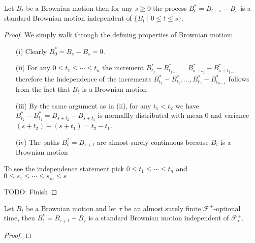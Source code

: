 \begin{thm}\label{MarkovPropertyBrownianMotion}Let $B_t$ be a
  Brownian motion then for any $s \geq 0$ the process $B^*_t = B_{t + s} -
  B_s$ is a standard Brownian motion independent of $\lbrace B_t \mid
  0 \leq t \leq s \rbrace$.
\end{thm}
\begin{proof}
We simply walk through the defining properties of Brownian motion:
\begin{itemize}
\item[(i)] Clearly $B^*_0 = B_s - B_s = 0$.
\item[(ii)] For any $0 \leq t_1 \leq \cdots \leq t_n$ the increment
  $B^*_{t_j} - B^*_{t_{j-1}} = B^*_{s+ t_j} - B^*_{s+ t_{j-1}}$
  therefore the independence of the increments $B^*_{t_2} -
  B^*_{t_1}, \dotsc, B^*_{t_n} - B^*_{t_{n-1}}$ follows from the fact
  that $B_t$ is a Brownian motion
\item[(iii)]By the same argument as in (ii), for any $t_1 < t_2$ we
  have $B^*_{t_2} -  B^*_{t_1} = B_{s+t_2} -  B_{s+t_1}$ is normallly
  distributed with mean $0$ and variance $(s + t_2) - (s+t_1) = t_2 -
  t_1$.
\item[(iv)]The paths $B^*_t = B_{s+t}$ are almost surely continuous
  because $B_t$ is a Brownian motion
\end{itemize}

To see the independence statement pick $0 \leq t_1 \leq \cdots \leq
t_n$ and $0 \leq s_1 \leq \cdots \leq s_m \leq s$ 

TODO: Finish
\end{proof}

\begin{thm}\label{StrongMarkovPropertyBrownianMotion}Let $B_t$ be a
  Brownian motion and let $\tau$ be an almost surely finite $\mathcal{F}^+$-optional
  time, then $B^*_t = B_{\tau + t} - B_\tau$ is a standard Brownian
  motion independent of $\mathcal{F}^+_\tau$.
\end{thm}
\begin{proof}
\end{proof}

